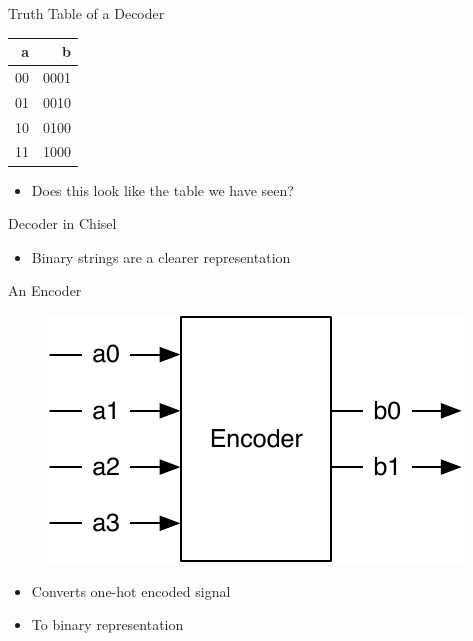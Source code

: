 \begin{frame}[fragile]{Truth Table of a Decoder}
\begin{table}
  \begin{tabular}{rr}
    \toprule
    a & b \\
    \midrule
    00 & 0001 \\
    01 & 0010 \\
    10 & 0100 \\
    11 & 1000 \\
    \bottomrule 
  \end{tabular} 
\end{table}
\begin{itemize}
\item Does this look like the table we have seen?
\end{itemize}
\end{frame}

\begin{frame}[fragile]{Decoder in Chisel}
\begin{itemize}
\item Binary strings are a clearer representation
\end{itemize}
\end{frame}

\begin{frame}[fragile]{An Encoder}
\begin{figure}
  \includegraphics[scale=\scale]{../figures/encoder}
\end{figure}
\begin{itemize}
\item Converts one-hot encoded signal
\item To binary representation
\end{itemize}
\end{frame}

